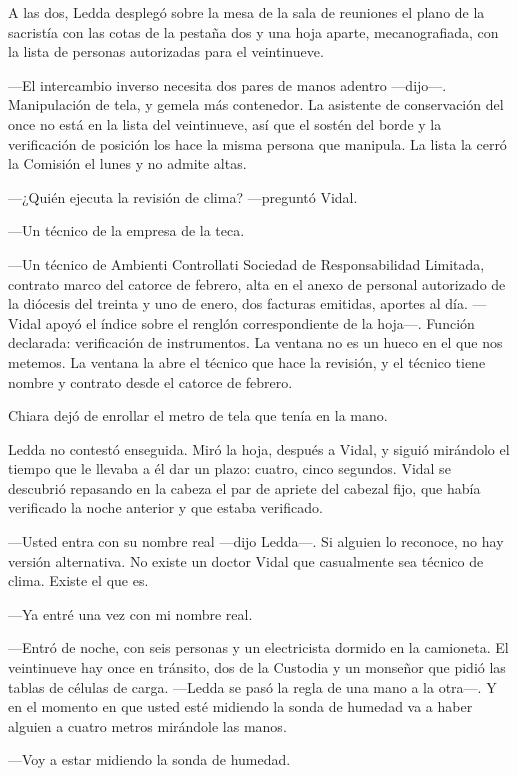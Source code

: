 A las dos, Ledda desplegó sobre la mesa de la sala de reuniones el plano de la sacristía con las cotas de la pestaña dos y una hoja aparte, mecanografiada, con la lista de personas autorizadas para el veintinueve.

---El intercambio inverso necesita dos pares de manos adentro ---dijo---. Manipulación de tela, y gemela más contenedor. La asistente de conservación del once no está en la lista del veintinueve, así que el sostén del borde y la verificación de posición los hace la misma persona que manipula. La lista la cerró la Comisión el lunes y no admite altas.

---¿Quién ejecuta la revisión de clima? ---preguntó Vidal.

---Un técnico de la empresa de la teca.

---Un técnico de Ambienti Controllati Sociedad de Responsabilidad Limitada, contrato marco del catorce de febrero, alta en el anexo de personal autorizado de la diócesis del treinta y uno de enero, dos facturas emitidas, aportes al día. ---Vidal apoyó el índice sobre el renglón correspondiente de la hoja---. Función declarada: verificación de instrumentos. La ventana no es un hueco en el que nos metemos. La ventana la abre el técnico que hace la revisión, y el técnico tiene nombre y contrato desde el catorce de febrero.

Chiara dejó de enrollar el metro de tela que tenía en la mano.

Ledda no contestó enseguida. Miró la hoja, después a Vidal, y siguió mirándolo el tiempo que le llevaba a él dar un plazo: cuatro, cinco segundos. Vidal se descubrió repasando en la cabeza el par de apriete del cabezal fijo, que había verificado la noche anterior y que estaba verificado.

---Usted entra con su nombre real ---dijo Ledda---. Si alguien lo reconoce, no hay versión alternativa. No existe un doctor Vidal que casualmente sea técnico de clima. Existe el que es.

---Ya entré una vez con mi nombre real.

---Entró de noche, con seis personas y un electricista dormido en la camioneta. El veintinueve hay once en tránsito, dos de la Custodia y un monseñor que pidió las tablas de células de carga. ---Ledda se pasó la regla de una mano a la otra---. Y en el momento en que usted esté midiendo la sonda de humedad va a haber alguien a cuatro metros mirándole las manos.

---Voy a estar midiendo la sonda de humedad.


